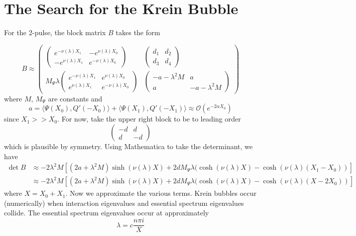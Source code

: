 \documentclass[thesis.tex]{subfiles}
\begin{document}
\section{The Search for the Krein Bubble}

For the 2-pulse, the block matrix $B$ takes the form

\[
B \approx \begin{pmatrix}
\begin{pmatrix}
e^{-\nu(\lambda)X_1} & -e^{\nu(\lambda)X_0} \\
-e^{\nu(\lambda)X_1} & e^{-\nu(\lambda)X_0} 
\end{pmatrix} &
\begin{pmatrix}
d_1 & d_2 \\ d_3 & d_4
\end{pmatrix} \\
M_\Psi \lambda
\begin{pmatrix}
e^{-\nu(\lambda)X_1} & e^{\nu(\lambda)X_0} \\
e^{\nu(\lambda)X_1} & e^{-\nu(\lambda)X_0} 
\end{pmatrix} &
\begin{pmatrix}
-a - \lambda^2 M & a \\
a & -a - \lambda^2 M
\end{pmatrix}
\end{pmatrix}
\]
where $M$, $M_\Psi$ are constants and
\[
a = \langle \Psi(X_0), Q'(-X_0) \rangle
+ \langle \Psi(X_1), Q'(-X_1) \rangle \approx \mathcal{O}(e^{-2\alpha X_0})
\]
since $X_1 >> X_0$. For now, take the upper right block to be to leading order
\[
\begin{pmatrix}
-d & d \\ d & -d
\end{pmatrix} 
\] 
which is plausible by symmetry. Using Mathematica to take the determinant, we have
\begin{align*}
\det B &\approx -2 \lambda^2 M \left[ (2a + \lambda^2 M) \sinh(\nu(\lambda)X) + 2 d M_\Psi \lambda 
(\cosh(\nu(\lambda)X) - \cosh(\nu(\lambda)(X_1 - X_0))
\right] \\
&\approx -2 \lambda^2 M \left[ (2a + \lambda^2 M) \sinh(\nu(\lambda)X) + 2 d M_\Psi \lambda 
(\cosh(\nu(\lambda)X) - \cosh(\nu(\lambda)(X - 2 X_0))
\right]
\end{align*}
where $X = X_0 + X_1$. Now we approximate the various terms. Krein bubbles occur (numerically) when interaction eigenvalues and essential spectrum eigenvalues collide. The essential spectrum eigenvalues occur at approximately 
\[
\lambda = c \frac{n \pi i}{X}
\]
\end{document}
